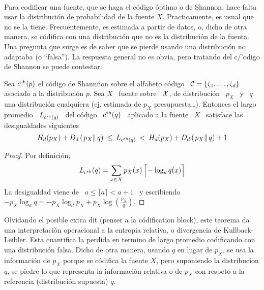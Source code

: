 \begin{figure}[h!]
%
\begin{center}  \end{center}
%
%
\label{fig:SZ:CodigosExtensiones}
\end{figure}

\

Para codificar una  fuente, que se haga el c\'odigo \'optimo  o de Shannon, hace
falta usar la distribuci\'on de probabilidad de la fuente $X$. Practicamente, es
usual que  no se  la tiene. Frecuentemente,  es estimada  a partir de  datos, o,
dicho  de  otra manera,  se  c\'odifica  con una  distribuci\'on  que  no es  la
distribuci\'on de  la fuenta. Una pregunta que  surge es de saber  que se pierde
usando una distribuci\'on no adaptaba  (o ``falsa''). La respuesta general no es
obvia, pero tratando del c/'odigo de Shannon se puede contestar:


\begin{teorema}
  Sea $c^{\mathrm{sh}}(p)$ el  c\'odigo de Shannnon sobre el alfabeto c\'odigo  \ $\mathcal{C} = \{
  \zeta_1 ,  \ldots , \zeta_d \}$ asociado  a la distribuci\'on $p$.   Sea $X$ \
  fuente sobre  \ $\mathcal{X}$, de distribuci\'on \  $p_X$ \ y \  $q$ una distribuci\'on
  cualquiera  (ej.  estimada  de  $p_X$ presupuesta\ldots).   Entonces el  largo
  promedio \ $L_{c^{\mathrm{sh}}(q)}$ \ del c\'odigo \ $c^{\mathrm{sh}}(q)$ \ aplicado a la fuente \
  $X$ \ satisface las desigualdades siguientes
  \[
  H_d(p_X) + D_d\left( \left. p_X \right\| q  \right) \: \le \: L_{c^{\mathrm{sh}}(q)} \: < \:
  H_d(p_X) + D_d\left( \left. p_X \right\| q \right) + 1
  \]
\end{teorema}
%
\begin{proof}
  Por definici\'on,
  \[
  L_{c^{\mathrm{sh}}}(q) = \sum_{x \in X} p_X(x) \, \Big\lceil\! -\log_d q(x) \Big\rceil
  \]
  La desigualdad viene de  \ $a \le \lceil a \rceil < a +  1$ \ y escribiendo $-
  p_X \log_d q = - p_X \log_d p_X + p_X \log \left( \frac{p_X}{q} \right)$.
\end{proof}
%
Olvidando el posible extra dit  (penser a la c\'odification block), este teorema
da una  interpretaci\'on operacional  a la entropia  relativa, o  divergencia de
Kullback-Leibler.   Esta cuantifica  la  perdida en  termino  de largo  promedio
codificando con  una distribuci\'on falsa. Dicho  de otra manera,  usando $q$ en
lugar de $p_X$, se usa la  informaci\'on de $p_X$ porque se c\'odifica la fuente
$X$,  pero suponiendo  la distribuc\'ion  $q$, se  piedre lo  que  representa la
informaci\'on relativa  o de $p_X$  con respeto a la  referencia (distribuci\'on
supuesta) $q$.

